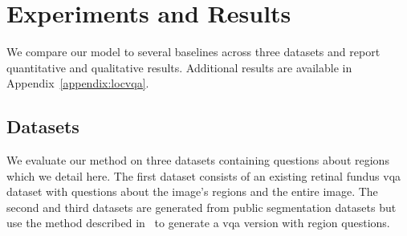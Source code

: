 \section{Experiments and Results}
\label{sec:locvqa_locatt_experiments_and_results}

We compare our model to several baselines across three datasets and report quantitative and qualitative results. Additional results are available in Appendix~\ref{appendix:locvqa}. 

\subsection{Datasets}
\label{subsec:locvqa_datasets}
We evaluate our method on three datasets containing questions about regions which we detail here. The first dataset consists of an existing retinal fundus \gls{vqa} dataset with questions about the image's regions and the entire image. The second and third datasets are generated from public segmentation datasets but  use the method described in~\cite{vu2020question} to generate a \gls{vqa} version with region questions. %
